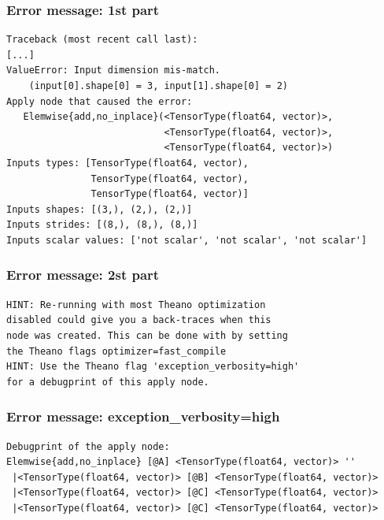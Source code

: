 \documentclass[utf8x,xcolor=pdftex,dvipsnames,table]{beamer}
\begin{document}
\begin{frame}[fragile]
  \frametitle{Error message: 1st part}

\begin{lstlisting}
Traceback (most recent call last):
[...]
ValueError: Input dimension mis-match.
    (input[0].shape[0] = 3, input[1].shape[0] = 2)
Apply node that caused the error:
   Elemwise{add,no_inplace}(<TensorType(float64, vector)>,
                            <TensorType(float64, vector)>,
                            <TensorType(float64, vector)>)
Inputs types: [TensorType(float64, vector),
               TensorType(float64, vector),
               TensorType(float64, vector)]
Inputs shapes: [(3,), (2,), (2,)]
Inputs strides: [(8,), (8,), (8,)]
Inputs scalar values: ['not scalar', 'not scalar', 'not scalar']
\end{lstlisting}
\end{frame}

\begin{frame}[fragile]
  \frametitle{Error message: 2st part}

\begin{lstlisting}
HINT: Re-running with most Theano optimization
disabled could give you a back-traces when this
node was created. This can be done with by setting
the Theano flags optimizer=fast_compile
HINT: Use the Theano flag 'exception_verbosity=high'
for a debugprint of this apply node.
\end{lstlisting}
\end{frame}

\begin{frame}[fragile]
  \frametitle{Error message: exception\_verbosity=high}

\begin{lstlisting}
Debugprint of the apply node:
Elemwise{add,no_inplace} [@A] <TensorType(float64, vector)> ''
 |<TensorType(float64, vector)> [@B] <TensorType(float64, vector)>
 |<TensorType(float64, vector)> [@C] <TensorType(float64, vector)>
 |<TensorType(float64, vector)> [@C] <TensorType(float64, vector)>
\end{lstlisting}
\end{frame}
\end{document}
